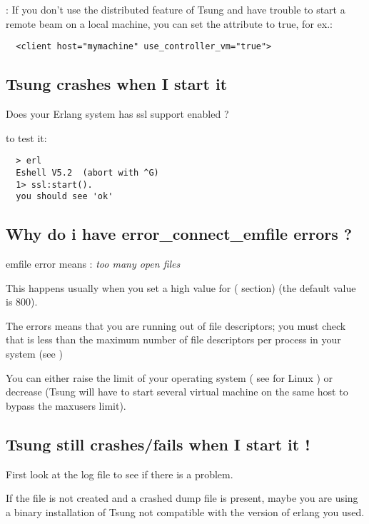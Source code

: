 \documentclass{TSUNG-en}
\begin{document}
\begin{appendix}
: If you don't use the distributed feature of
Tsung and have trouble to start a remote beam on a local machine,
you can set the  attribute to true, for ex.:

\begin{Verbatim}
  <client host="mymachine" use_controller_vm="true">
\end{Verbatim}


\subsection{Tsung crashes when I start it }

Does your Erlang system has ssl support enabled ?

to test it:
\begin{Verbatim}
  > erl
  Eshell V5.2  (abort with ^G)
  1> ssl:start().
  you should see 'ok'
\end{Verbatim}

\subsection{Why do i have error\_connect\_emfile errors ?}
\label{sec:faq:emfile}
emfile error means : \emph{too many open files}

This happens usually when you set a high value for 
( section) (the default value is 800).


The errors means that you are running out of file descriptors; you
must check that  is less than the maximum number of
file descriptors per process in your system (see )

You can either raise the limit of your operating system ( see
 for Linux ) or decrease 
(Tsung will have to start several virtual machine on the same host to
bypass the maxusers limit).

\subsection{Tsung still crashes/fails  when I start it !}
First look at the log file
 to see
if there is a problem.

If the file is not created and a crashed dump file is present, maybe
you are using a binary installation of Tsung not compatible with the
version of erlang you used.


\end{appendix}
\end{document}
